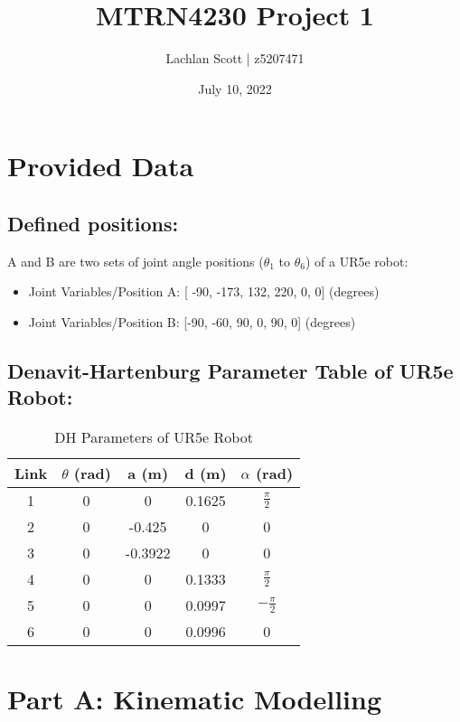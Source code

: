 \documentclass[fleqn]{article}
\title{MTRN4230 Project 1}
\author{Lachlan Scott | z5207471}
\date{July 10, 2022}
\begin{document}
\maketitle

\section{Provided Data}
\subsection{Defined positions:}
A and B are two sets of joint angle positions ($\theta_1$ to $\theta_6$) of a UR5e robot:
\begin{itemize} 
    \item Joint Variables/Position A: [ -90, -173, 132, 220, 0, 0] (degrees)
    \item Joint Variables/Position B: [-90, -60, 90, 0, 90, 0] (degrees)
\end{itemize}
\subsection{Denavit-Hartenburg Parameter Table of UR5e Robot:}

\begin{table}[!ht]
    \caption{DH Parameters of UR5e Robot}
    \begin{center}
    \begin{tabular}{||c | c | c | c | c||} 
     \hline
     Link & $\theta$ (rad) & a (m) & d (m) & $\alpha$ (rad)\\
     \hline\hline
     1 & 0 & 0 & 0.1625 & $\frac{\pi}{2}$ \\ [1ex] 
     \hline
     2 & 0 & -0.425 & 0 & 0 \\ [1ex] 
     \hline
     3 & 0 & -0.3922 & 0 & 0 \\ [1ex] 
     \hline
     4 & 0 & 0 & 0.1333 & $\frac{\pi}{2}$ \\ [1ex] 
     \hline
     5 & 0 & 0 & 0.0997 & $-\frac{\pi}{2}$ \\ [1ex] 
     \hline
     6 & 0 & 0 & 0.0996 & 0 \\ [1ex] 
     \hline
    \end{tabular}
    \end{center}
\end{table}

\section{Part A: Kinematic Modelling}
\end{document}
